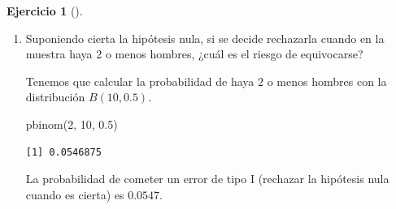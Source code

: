 \documentclass[
  a4paper,
]{scrreport}
\newenvironment{Shaded}{\begin{snugshade}}{\end{snugshade}}
\newcommand{\DecValTok}[1]{\textcolor[rgb]{0.68,0.00,0.00}{#1}}
\newcommand{\FloatTok}[1]{\textcolor[rgb]{0.68,0.00,0.00}{#1}}
\newcommand{\FunctionTok}[1]{\textcolor[rgb]{0.28,0.35,0.67}{#1}}
\newcommand{\NormalTok}[1]{\textcolor[rgb]{0.00,0.23,0.31}{#1}}
\theoremstyle{definition}
\newtheorem{exercise}{Ejercicio}[chapter]
\theoremstyle{remark}
\begin{document}
\begin{exercise}[]
\begin{enumerate}
\begin{tcolorbox}
  Tenemos que calcular la probabilidad de \(0\) hombres con la
  distribución \(B(10, 0.5)\).

\begin{Shaded}
\begin{Highlighting}[]
\FunctionTok{pbinom}\NormalTok{(}\DecValTok{0}\NormalTok{, }\DecValTok{10}\NormalTok{, }\FloatTok{0.5}\NormalTok{)}
\end{Highlighting}
\end{Shaded}

\begin{verbatim}
[1] 0.0009765625
\end{verbatim}

  Como se ve, la probabilidad de obtener 0 hombres en una muestra
  aleatoria con reemplazamiento de 10 personas tomadas de una población
  con el mismo número de hombres y mujeres es muy baja, por lo que, en
  este caso rechazaríamos la hipótesis nula sin dudarlo.

  \end{tcolorbox}
\item
  Suponiendo cierta la hipótesis nula, si se decide rechazarla cuando en
  la muestra haya 2 o menos hombres, ¿cuál es el riesgo de equivocarse?

  \begin{tcolorbox}[enhanced jigsaw, colframe=quarto-callout-tip-color-frame, toprule=.15mm, bottomtitle=1mm, breakable, opacitybacktitle=0.6, toptitle=1mm, colback=white, bottomrule=.15mm, title=\textcolor{quarto-callout-tip-color}{\faLightbulb}\hspace{0.5em}{Solución}, arc=.35mm, left=2mm, titlerule=0mm, rightrule=.15mm, coltitle=black, leftrule=.75mm, opacityback=0, colbacktitle=quarto-callout-tip-color!10!white]

  Tenemos que calcular la probabilidad de haya \(2\) o menos hombres con
  la distribución \(B(10, 0.5)\).

\begin{Shaded}
\begin{Highlighting}[]
\FunctionTok{pbinom}\NormalTok{(}\DecValTok{2}\NormalTok{, }\DecValTok{10}\NormalTok{, }\FloatTok{0.5}\NormalTok{)}
\end{Highlighting}
\end{Shaded}

\begin{verbatim}
[1] 0.0546875
\end{verbatim}

  La probabilidad de cometer un error de tipo I (rechazar la hipótesis
  nula cuando es cierta) es \(0.0547\).


\end{tcolorbox}
\end{enumerate}
\end{exercise}
\end{document}
